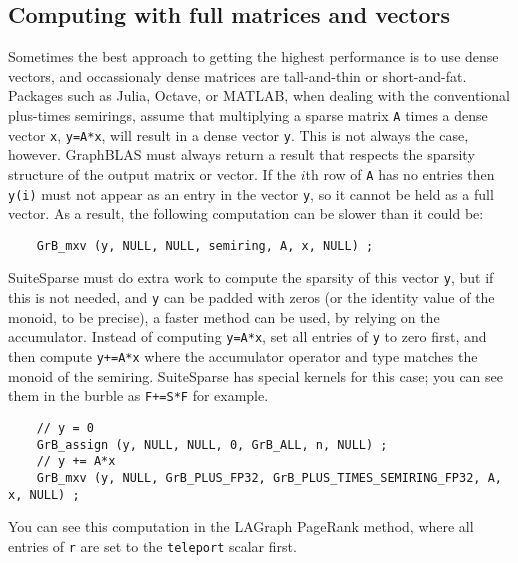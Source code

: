 \documentclass[12pt]{article}
\begin{document}
\subsection{Computing with full matrices and vectors}

Sometimes the best approach to getting the highest performance is to use dense
vectors, and occassionaly dense matrices are tall-and-thin or short-and-fat.
Packages such as Julia, Octave, or MATLAB, when dealing with the conventional
plus-times semirings, assume that multiplying a sparse matrix \verb'A' times a
dense vector \verb'x', \verb'y=A*x', will result in a dense vector \verb'y'.
This is not always the case, however. GraphBLAS must always return a result
that respects the sparsity structure of the output matrix or vector.  If the
$i$th row of \verb'A' has no entries then \verb'y(i)' must not appear as an
entry in the vector \verb'y', so it cannot be held as a full vector.  As a
result, the following computation can be slower than it could be:

    {\footnotesize
    \begin{verbatim}
    GrB_mxv (y, NULL, NULL, semiring, A, x, NULL) ; \end{verbatim}}

SuiteSparse must do extra work to compute the sparsity of this vector \verb'y',
but if this is not needed, and \verb'y' can be padded with zeros (or
the identity value of the monoid, to be precise), a faster method can be used,
by relying on the accumulator.  Instead of computing \verb'y=A*x', set all
entries of \verb'y' to zero first, and then compute \verb'y+=A*x' where the
accumulator operator and type matches the monoid of the semiring.  SuiteSparse
has special kernels for this case; you can see them in the burble as
\verb'F+=S*F' for example.

    {\footnotesize
    \begin{verbatim}
    // y = 0
    GrB_assign (y, NULL, NULL, 0, GrB_ALL, n, NULL) ;
    // y += A*x
    GrB_mxv (y, NULL, GrB_PLUS_FP32, GrB_PLUS_TIMES_SEMIRING_FP32, A, x, NULL) ; \end{verbatim}}

You can see this computation in the LAGraph PageRank method, where all
entries of \verb'r' are set to the \verb'teleport' scalar first.
\end{document}
